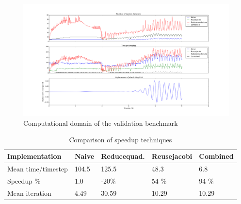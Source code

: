 \begin{figure}[h!]
\hspace*{-2.2cm}   
 \includegraphics[scale=0.36]{./Fig/itercompare.png}
 \caption{Computational domain of the validation benchmark}
\end{figure}


\begin{table}[h]
\centering
\caption{Comparison of speedup techniques }
\label{my-label}
\begin{tabular}{ |p{2.8cm}|p{2.4cm}||p{2.4cm}|p{2.4cm}|p{2.4cm}|  }
 \hline
Implementation &Naive  & Reducequad. & Reusejacobi & Combined \\
 \hline
 Mean time/timestep &   104.5 &  125.5 & 48.3  & 6.8   \\
 \hline
 Speedup \% & 1.0 &  -20\%  & 54 \%  & 94 \%   \\
 \hline
 Mean iteration &  4.49 &  30.59 & 10.29  & 10.29   \\
 \hline
\end{tabular}
\end{table}
